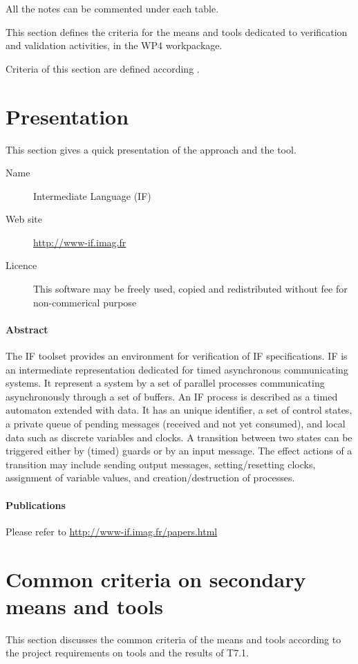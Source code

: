 All the notes can be commented under each table.

This section defines the criteria for the means and tools dedicated to verification and validation activities, in the WP4 workpackage. 

Criteria of this section are defined according \citep{D4.1}.

\section{Presentation}

This section gives a quick presentation of the approach and the tool.

\begin{description}
\item[Name]  Intermediate Language (IF)
\item[Web site]  \url{http://www-if.imag.fr}
\item[Licence]  This software may be freely used, copied and redistributed without fee for non-commerical purpose
\end{description}

\paragraph{Abstract}  The IF toolset provides an environment for verification of IF specifications. IF is an intermediate representation dedicated for timed asynchronous communicating systems. It represent a system by a set of parallel processes communicating asynchronously through a set of buffers. An IF process is described as a timed automaton extended with data. It has an unique identifier, a set of control states, a private queue of pending messages (received and not yet consumed), and local data such as discrete variables and clocks. A transition between two states can be triggered either by (timed) guards or by an input message. The effect actions of a transition may include sending output messages, setting/resetting clocks, assignment of variable values, and creation/destruction of processes.

\paragraph{Publications} Please refer to \url{http://www-if.imag.fr/papers.html}


\section{Common criteria on secondary means and tools}
\label{common}
This section discusses the common criteria of the means and tools according to the project requirements on tools and the results of T7.1.

